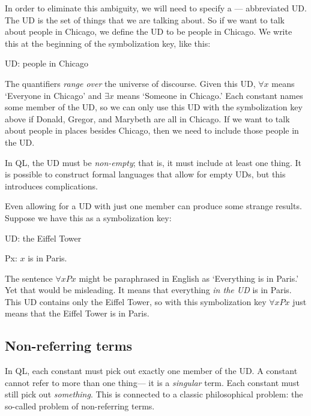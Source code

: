 In order to eliminate this ambiguity, we will need to specify a --- abbreviated UD. The UD is the set of things that we are talking about. So if we want to talk about people in Chicago, we define the UD to be people in Chicago. We write this at the beginning of the symbolization key, like this:
\begin{ekey}
\item[UD:] people in Chicago
\end{ekey}
The quantifiers \emph{range over} the universe of discourse. Given this UD, $\forall x$ means `Everyone in Chicago' and $\exists x$ means `Someone in Chicago.' Each constant names some member of the UD, so we can only use this UD with the symbolization key above if Donald, Gregor, and Marybeth are all in Chicago. If we want to talk about people in places besides Chicago, then we need to include those people in the UD.


In QL, the UD must be \emph{non-empty}; that is, it must include at least one thing. It is possible to construct formal languages that allow for empty UDs, but this introduces complications.

Even allowing for a UD with just one member can produce some strange results. Suppose we have this as a symbolization key:
\begin{ekey}
\item[UD:] the Eiffel Tower
\item[Px:] $x$ is in Paris.
\end{ekey}
The sentence $\forall x Px$ might be paraphrased in English as `Everything is in Paris.' Yet that would be misleading. It means that everything \emph{in the UD} is in Paris. This UD contains only the Eiffel Tower, so with this symbolization key $\forall x Px$ just means that the Eiffel Tower is in Paris.



\subsection{Non-referring terms}
In QL, each constant must pick out exactly one member of the UD. A constant cannot refer to more than one thing--- it is a \emph{singular} term. Each constant must still pick out \emph{something}. This is connected to a classic philosophical problem: the so-called problem of non-referring terms.

